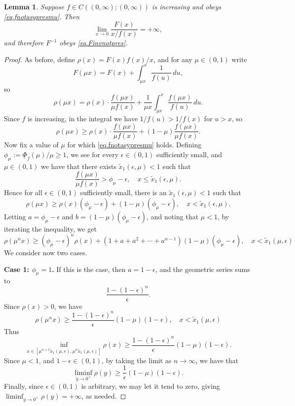 \documentclass[a4paper,10pt,reqno]{amsart}
\numberwithin{equation}{section}
\newtheorem{lemma}{Lemma}
\theoremstyle{definition}
\theoremstyle{remark}
\DeclareMathOperator{\1}{\mathbbm 1}
\begin{document}
	\begin{lemma}
		Suppose $f\in C((0,\infty);(0,\infty))$ is increasing and obeys 
		\eqref{eq.fnotasypresmu}. Then
		\[
		\lim_{x\to 0} \frac{F(x)}{x/f(x)}=+\infty,
		\] 	
		and therefore $F^{-1}$ obeys \eqref{eq.Finvnotpres}.
	\end{lemma}
	\begin{proof}
		As before, define $\rho(x)=F(x)f(x)/x$, and for any $\mu\in (0,1)$ write 
		\[
		F(\mu x)=F(x)+\int_{\mu x}^x \frac{1}{f(u)}\,du,
		\]
		so 
		\[
		\rho(\mu x)=\rho(x)\cdot\frac{f(\mu x)}{\mu f(x)} + \frac{1}{\mu x}\int_{\mu x}^x \frac{f(\mu x)}{f(u)}\,du.
		\]
		Since $f$ is increasing, in the integral we have $1/f(u)>1/f(x)$ for $u>x$, so 
		\begin{equation} \label{eq.rholwrbd1}
			\rho(\mu x)\geq \rho(x)\cdot\frac{f(\mu x)}{\mu f(x)} + (1-\mu)\frac{f(\mu x)}{\mu f(x)}.
		\end{equation}
		Now fix a value of $\mu$ for which \eqref{eq.fnotasypresmu} holds. Defining $\phi_\mu:=\underline{\Phi}_f(\mu)/\mu\geq 1$, we see for every $\epsilon\in (0,1)$ sufficiently small, and $\mu\in (0,1)$ we have that there exists $\tilde{x}_1(\epsilon,\mu)<1$ such that 
		\[
		\frac{f(\mu x)}{\mu f(x)} > \phi_\mu-\epsilon, \quad x\leq \tilde{x}_1(\epsilon,\mu).
		\]
		Hence for all $\epsilon\in (0,1)$ sufficiently small, there is an $\tilde{x}_1(\epsilon,\mu)<1$ such that 
		\begin{equation} \label{eq.rholwrbd2}
			\rho(\mu x)\geq \rho(x) (\phi_\mu-\epsilon) + (1-\mu)(\phi_\mu-\epsilon), \quad x<\tilde{x}_1(\epsilon,\mu).
		\end{equation}
		Letting $a=\phi_\mu-\epsilon$ and $b=(1-\mu)(\phi_\mu-\epsilon)$, and noting that $\mu<1$, by iterating the inequality, we get  
		\[
		\rho(\mu^n x) \geq (\phi_\mu-\epsilon)^n\rho(x)+(1+a+a^2+\cdots+a^{n-1})(1-\mu)(\phi_\mu-\epsilon), \quad x<\tilde{x}_1(\mu,\epsilon)
		\] 
		We consider now two cases. 
		
		\textbf{Case 1: $\phi_\mu=1$.} If this is the case, then $a=1-\epsilon$, and 
		the geometric series sums to 
		\[
		\frac{1-(1-\epsilon)^n}{\epsilon}.
		\]
		Since $\rho(x)>0$, we have 
		\[
		\rho(\mu^n x) \geq\frac{1-(1-\epsilon)^n}{\epsilon}(1-\mu)(1-\epsilon), \quad x<\tilde{x}_1(\mu,\epsilon)
		\]
		Thus 
		\[
		\inf_{x\in [\mu^{n+1}\tilde{x}_1(\mu,\epsilon),\mu^n \tilde{x}_1(\mu,\epsilon)]} \rho(x)
		\geq \frac{1-(1-\epsilon)^n}{\epsilon}(1-\mu)(1-\epsilon).
		\]
		Since $\mu<1$, and $1-\epsilon\in (0,1)$, by taking the limit as $n\to\infty$, we have that 
		\[
		\liminf_{y\to 0^+} \rho(y)\geq \frac{1}{\epsilon}(1-\mu)(1-\epsilon).
		\]
		Finally, since $\epsilon\in (0,1)$ is arbitrary, we may let it tend to zero, giving $\liminf_{y\to 0^+} \rho(y)=+\infty$, as needed.
		

\end{proof}
\end{document}
